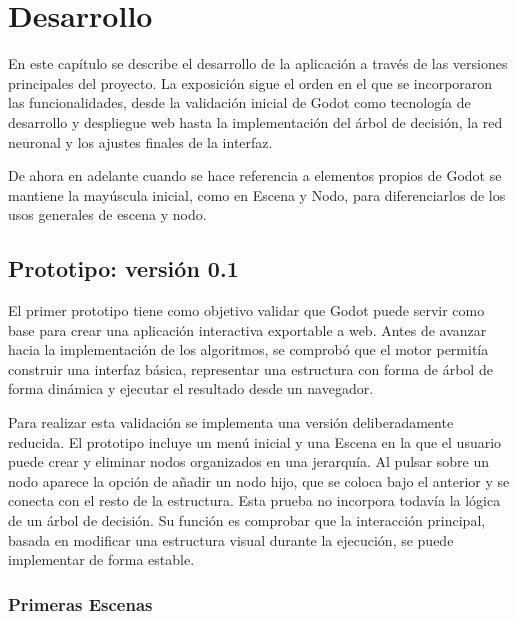 \chapter{Desarrollo}
\label{chap:desarrollo}

En este capítulo se describe el desarrollo de la aplicación a través de las versiones principales del proyecto.
La exposición sigue el orden en el que se incorporaron las funcionalidades, desde la validación inicial de Godot como tecnología de desarrollo y despliegue web hasta la implementación del árbol de decisión, la red neuronal y los ajustes finales de la interfaz.

De ahora en adelante cuando se hace referencia a elementos propios de Godot se mantiene la mayúscula inicial, como en \gls{Escena}  y \gls{Nodo}, para diferenciarlos de los usos generales de \gls{escena} y \gls{nodo}.

\section{Prototipo: versión 0.1}

El primer prototipo tiene como objetivo validar que Godot puede servir como base para crear una aplicación interactiva exportable a web.
Antes de avanzar hacia la implementación de los algoritmos, se comprobó que el motor permitía construir una interfaz básica, representar una estructura con forma de árbol de forma dinámica y ejecutar el resultado desde un navegador.

Para realizar esta validación se implementa una versión deliberadamente reducida.
El prototipo incluye un menú inicial y una \gls{Escena} en la que el usuario puede crear y eliminar \gls{nodo}s organizados en una jerarquía.
Al pulsar sobre un \gls{nodo} aparece la opción de añadir un \gls{nodo} hijo, que se coloca bajo el anterior y se conecta con el resto de la estructura.
Esta prueba no incorpora todavía la lógica de un árbol de decisión.
Su función es comprobar que la interacción principal, basada en modificar una estructura visual durante la ejecución, se puede implementar de forma estable.


\subsection[Primeras Escenas]{Primeras \protect\gls{Escena}s}

